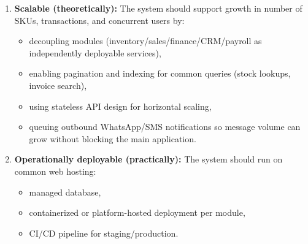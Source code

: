 \documentclass[11pt,a4paper]{article}
\begin{document}
\begin{enumerate}[leftmargin=0.7cm]
    \item \textbf{Scalable (theoretically):} The system should support growth in number of SKUs, transactions, and concurrent users by:
    \begin{itemize}[leftmargin=0.7cm]
        \item decoupling modules (inventory/sales/finance/CRM/payroll as independently deployable services),
        \item enabling pagination and indexing for common queries (stock lookups, invoice search),
        \item using stateless API design for horizontal scaling,
        \item queuing outbound WhatsApp/SMS notifications so message volume can grow without blocking the main application.
    \end{itemize}
    
    \item \textbf{Operationally deployable (practically):} The system should run on common web hosting:
    \begin{itemize}[leftmargin=0.7cm]
        \item managed database,
        \item containerized or platform-hosted deployment per module,
        \item CI/CD pipeline for staging/production.
    \end{itemize}
\end{enumerate}
\end{document}
